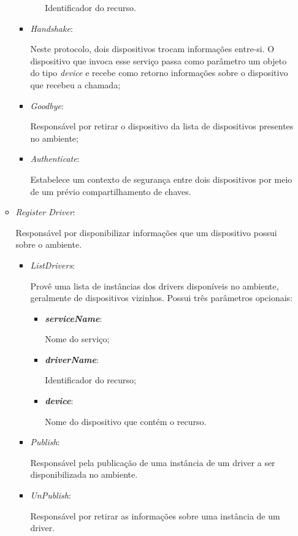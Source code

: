 \begin{itemize}
\begin{itemize}
\begin{itemize}
\begin{itemize}
							Identificador do recurso.
					\end{itemize}
				\item \emph{Handshake}: 

					Neste protocolo, dois dispositivos trocam informações entre-si. O dispositivo que invoca esse serviço passa como parâmetro um objeto do tipo \emph{device} e recebe como retorno informações sobre o dispositivo que recebeu a chamada;
				\item \emph{Goodbye}: 

					Responsável por retirar o dispositivo da lista de dispositivos presentes no ambiente;
				\item \emph{Authenticate}: 

					Estabelece um contexto de segurança entre dois dispositivos por meio de um prévio compartilhamento de chaves.
			\end{itemize}
		\item \emph{Register Driver}: 

			Responsável por disponibilizar informações que um dispositivo possui sobre o ambiente.
			\begin{itemize}
				\item \emph{ListDrivers}: 

					Provê uma lista de instâncias dos drivers disponíveis no ambiente, geralmente de dispositivos vizinhos. Possui três parâmetros opcionais:
					\begin{itemize}
						\item \emph{\bf{serviceName}}: 

							Nome do serviço;
						\item \emph{\bf{driverName}}: 

							Identificador do recurso;
						\item \emph{\bf{device}}: 
							
							Nome do dispositivo que contém o recurso.
					\end{itemize}
				\item \emph{Publish}: 

					Responsável pela publicação de uma instância de um driver a ser disponibilizada no ambiente.
				\item \emph{UnPublish}: 

					Responsável por retirar as informações sobre uma instância de um driver.
			\end{itemize}
	\end{itemize}
\end{itemize}